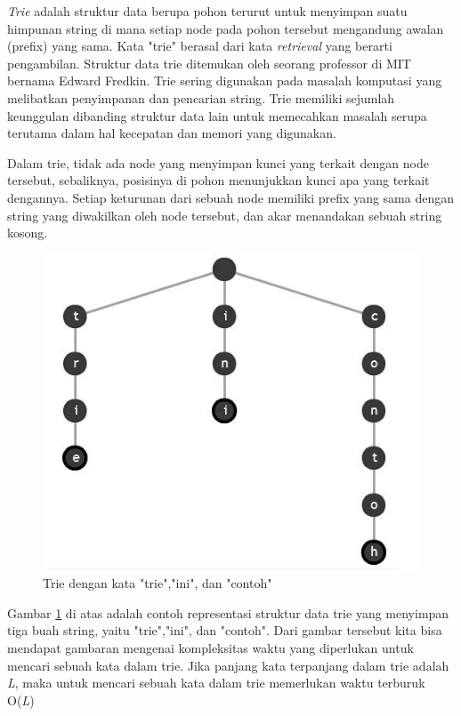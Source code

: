 \textit{Trie} adalah struktur data berupa pohon terurut untuk menyimpan suatu himpunan string di mana setiap node pada pohon tersebut mengandung awalan (prefix) yang sama\cite{najogie:10:trie}. Kata "trie" berasal dari kata \textit{retrieval} yang berarti pengambilan. Struktur data trie ditemukan oleh seorang professor di MIT bernama Edward Fredkin. Trie sering digunakan pada masalah komputasi yang melibatkan penyimpanan dan pencarian string. Trie memiliki sejumlah keunggulan dibanding struktur data lain untuk memecahkan masalah serupa terutama dalam hal kecepatan dan memori yang digunakan.

Dalam trie, tidak ada node yang menyimpan kunci yang terkait dengan node tersebut, sebaliknya, posisinya di pohon menunjukkan kunci apa yang terkait dengannya. Setiap keturunan dari sebuah node memiliki prefix yang sama dengan string yang diwakilkan oleh node tersebut, dan akar menandakan sebuah string kosong.

\begin{figure}[H]
\centering
\includegraphics[scale=1]{Gambar/contoh-trie-1}
\caption[Trie]{Trie dengan kata "trie","ini", dan "contoh"\cite{najogie:10:trie}} 
\label{contoh-trie-1}
\end{figure}

Gambar \ref{contoh-trie-1} di atas adalah contoh representasi struktur data trie yang menyimpan tiga buah string, yaitu "trie","ini", dan "contoh". Dari gambar tersebut kita bisa mendapat gambaran mengenai kompleksitas waktu yang diperlukan untuk mencari sebuah kata dalam trie. Jika panjang kata terpanjang dalam trie adalah \textit{L}, maka untuk mencari sebuah kata dalam trie memerlukan waktu terburuk O(\textit{L})

